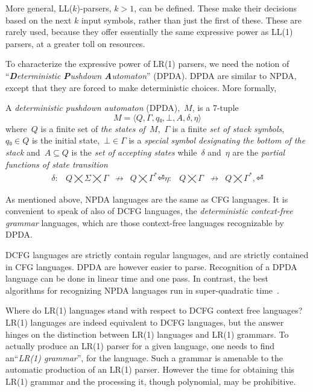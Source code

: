 More general, LL($k$)-parsers, $k>1$, can be defined. These make their
  decisions based on the next $k$ input symbols, rather than just the first of these.
These are rarely used, because they offer essentially the same expressive power as 
  LL(1) parsers, at a greater toll on resources. 

To characterize the expressive power of LR(1) parsers, we need the notion 
of ``\emph{\textbf Deterministic \textbf Pushdown \textbf Automaton}'' (DPDA). 
DPDA are similar to NPDA, except that they are forced 
  to make deterministic choices.
More formally, 
\begin{Definition}
  \label{Definition:DPDA}
  A \emph{deterministic pushdown automaton} (DPDA),~$M$, is a 7-tuple
  \[
    M =⟨Q,Γ, q₀,⊥, A,δ,η⟩
  \]
  where~$Q$ is a finite set of
  \emph{the states of~$M$},~$Γ$ is a finite
  \emph{set of stack symbols},~$q₀∈Q$ is the initial state,~$⊥∈Γ$
  is a \emph{special symbol designating the bottom of the stack}
  and~$A⊆Q$ is the \emph{set of accepting states} while~$δ$ and~$η$ are
  the \emph{partial functions of state transition}
  \[
    \begin{array}{crlc}
      δ: & Q⨉Σ⨉Γ &↛& Q⨉Γ^*⏎
      η: & Q⨉Γ &↛& Q⨉Γ^*,⏎
    \end{array}
  \]
\end{Definition}

As mentioned above, NPDA languages are the same as CFG languages.
It is convenient to speak of also of DCFG languages, the \emph{deterministic context-free grammar} languages, 
  which are those context-free languages recognizable by DPDA.
  
DCFG languages are strictly contain regular languages, and are strictly contained
  in CFG languages.
DPDA are however easier to parse. Recognition of a DPDA language 
  can be done in linear time and one pass.
  In contrast, the best algorithms for recognizing NPDA languages run in super-quadratic time~\cite{CYK,I forget the nnames}. 

Where do LR(1) languages stand with respect to DCFG context free languages? 
LR(1) languages are indeed equivalent to DCFG languages, but 
the answer hinges on the distinction 
  between LR(1) languages and LR(1) grammars. 
To actually produce an LR(1) parser for a given language, 
  one needs to find an``\emph{LR(1) grammar}'', for the language.
Such a grammar is amenable to 
  the automatic production of an LR(1) parser.
However the time for obtaining this LR(1) grammar and the processing it, 
  though polynomial, may be prohibitive. 


